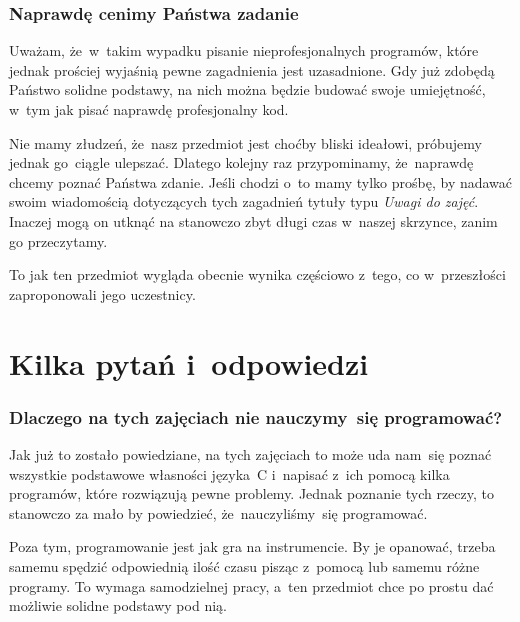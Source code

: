 \documentclass[10pt,t]{beamer}
\begin{document}
\begin{frame}
  \frametitle{Naprawdę cenimy Państwa zadanie}


  Uważam, że~w~takim wypadku pisanie nieprofesjonalnych programów, które
  jednak prościej wyjaśnią pewne zagadnienia jest uzasadnione. Gdy już
  zdobędą Państwo solidne podstawy, na nich można będzie budować
  swoje umiejętność, w~tym jak pisać naprawdę profesjonalny kod.

  Nie mamy złudzeń, że~nasz przedmiot jest choćby bliski ideałowi,
  próbujemy jednak go~ciągle ulepszać. Dlatego kolejny raz przypominamy,
  że~naprawdę chcemy poznać Państwa zdanie. Jeśli chodzi o~\email to mamy
  tylko prośbę, by nadawać swoim wiadomością dotyczących tych zagadnień
  tytuły typu \textit{Uwagi do zajęć}. Inaczej mogą on utknąć na stanowczo
  zbyt długi czas w~naszej skrzynce, zanim go przeczytamy.

  To jak ten przedmiot wygląda obecnie wynika częściowo z~tego, co
  w~przeszłości zaproponowali jego uczestnicy.

\end{frame}










\section{Kilka pytań i~odpowiedzi}


\begin{frame}
  \frametitle{Dlaczego na tych zajęciach nie nauczymy~się
    programować?}


  Jak już to zostało powiedziane, na tych zajęciach to może uda nam~się
  poznać wszystkie podstawowe własności języka~C i~napisać z~ich pomocą
  kilka programów, które rozwiązują pewne problemy. Jednak poznanie
  tych rzeczy, to stanowczo za mało by powiedzieć, że~nauczyliśmy~się
  programować.

  Poza tym, programowanie jest jak gra na instrumencie. By je opanować,
  trzeba samemu spędzić odpowiednią ilość czasu pisząc z~pomocą lub samemu
  różne programy. To wymaga samodzielnej pracy, a~ten przedmiot chce
  po prostu dać możliwie solidne podstawy pod nią.

\end{frame}
\end{document}
